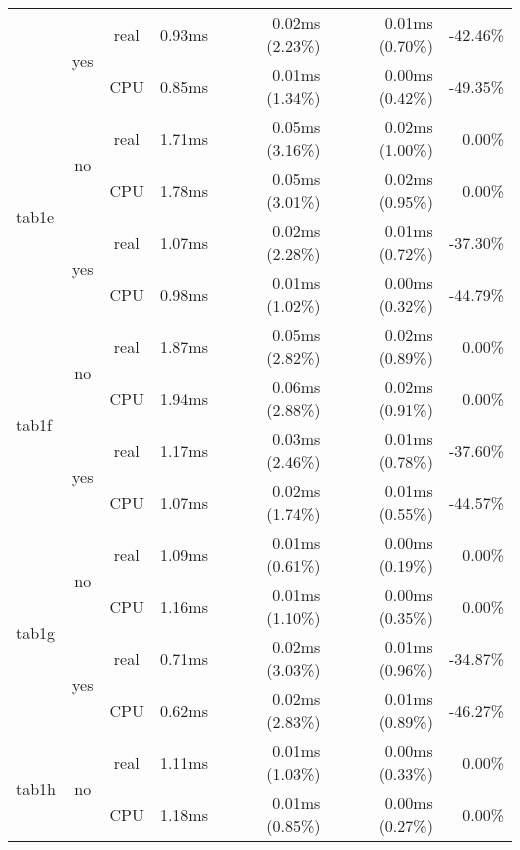 \documentclass[en]{pracamgr}
\begin{document}
\begin{appendices}
\begin{small}
\begin{longtable}{|l|c|c|r|r|r|r|}
                          \cline{2-7}
                          & \multirow{2}{*}{yes} & real & 0.93ms & 0.02ms (2.23\%) & 0.01ms (0.70\%) & -42.46\% \\*
                          &                      & CPU  & 0.85ms & 0.01ms (1.34\%) & 0.00ms (0.42\%) & -49.35\% \\
\hline
\multirow{4}{*}{tab1e}    & \multirow{2}{*}{no}  & real & 1.71ms & 0.05ms (3.16\%) & 0.02ms (1.00\%) & 0.00\% \\*
                          &                      & CPU  & 1.78ms & 0.05ms (3.01\%) & 0.02ms (0.95\%) & 0.00\% \\*
                          \cline{2-7}
                          & \multirow{2}{*}{yes} & real & 1.07ms & 0.02ms (2.28\%) & 0.01ms (0.72\%) & -37.30\% \\*
                          &                      & CPU  & 0.98ms & 0.01ms (1.02\%) & 0.00ms (0.32\%) & -44.79\% \\
\hline
\multirow{4}{*}{tab1f}    & \multirow{2}{*}{no}  & real & 1.87ms & 0.05ms (2.82\%) & 0.02ms (0.89\%) & 0.00\% \\*
                          &                      & CPU  & 1.94ms & 0.06ms (2.88\%) & 0.02ms (0.91\%) & 0.00\% \\*
                          \cline{2-7}
                          & \multirow{2}{*}{yes} & real & 1.17ms & 0.03ms (2.46\%) & 0.01ms (0.78\%) & -37.60\% \\*
                          &                      & CPU  & 1.07ms & 0.02ms (1.74\%) & 0.01ms (0.55\%) & -44.57\% \\
\hline
\multirow{4}{*}{tab1g}    & \multirow{2}{*}{no}  & real & 1.09ms & 0.01ms (0.61\%) & 0.00ms (0.19\%) & 0.00\% \\*
                          &                      & CPU  & 1.16ms & 0.01ms (1.10\%) & 0.00ms (0.35\%) & 0.00\% \\*
                          \cline{2-7}
                          & \multirow{2}{*}{yes} & real & 0.71ms & 0.02ms (3.03\%) & 0.01ms (0.96\%) & -34.87\% \\*
                          &                      & CPU  & 0.62ms & 0.02ms (2.83\%) & 0.01ms (0.89\%) & -46.27\% \\
\hline
\multirow{4}{*}{tab1h}    & \multirow{2}{*}{no}  & real & 1.11ms & 0.01ms (1.03\%) & 0.00ms (0.33\%) & 0.00\% \\*
                          &                      & CPU  & 1.18ms & 0.01ms (0.85\%) & 0.00ms (0.27\%) & 0.00\% \\*

\end{longtable}
\end{small}
\end{appendices}
\end{document}
